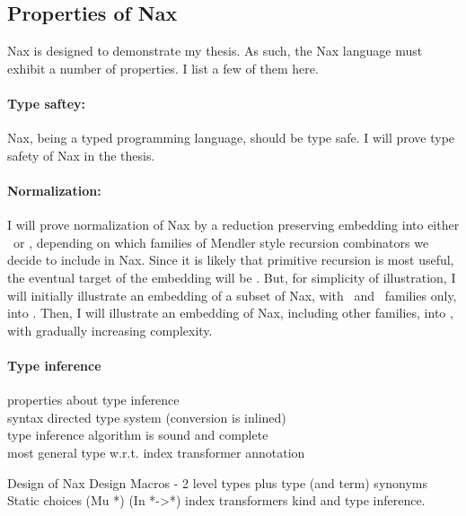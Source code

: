 \subsection{Properties of Nax}\label{sec:Nax:theory}

Nax is designed to demonstrate my thesis. As such, the Nax language must exhibit
a number of properties. I list a few of them here.

\paragraph{Type saftey:}
Nax, being a typed programming language, should be type safe.
I will prove type safety of Nax in the thesis.

\paragraph{Normalization:}
I will prove normalization of Nax by a reduction preserving embedding into
either \Fi\ or \Fixw, depending on which families of Mendler style recursion
combinators we decide to include in Nax. Since it is likely that 
primitive recursion is most useful, the eventual target of the embedding will
be \Fixw. But, for simplicity of illustration, I will initially
illustrate an embedding of a subset of Nax, with \MIt\ and \MsfIt\
families only, into \Fi. Then, I will illustrate an embedding of Nax,
including other families, into \Fixw, with gradually increasing complexity.

\paragraph{Type inference}
properties about type inference \\
syntax directed type system (conversion is inlined) \\
type inference algorithm is sound and complete \\
most general type w.r.t. index transformer annotation

Design of Nax
    Design Macros - 2 level types plus type (and term) synonyms
    Static choices (Mu *)  (In *->*)   index transformers
    kind and type inference.


